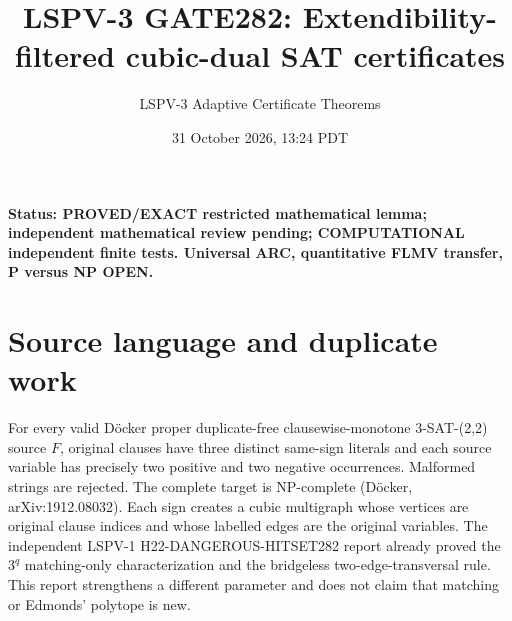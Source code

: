 \documentclass[11pt]{article}
\title{LSPV-3 GATE282: Extendibility-filtered cubic-dual SAT certificates}
\author{LSPV-3 Adaptive Certificate Theorems}
\date{31 October 2026, 13:24 PDT}
\begin{document}
\maketitle
\noindent\textbf{Status: PROVED/EXACT restricted mathematical lemma; independent mathematical review pending; COMPUTATIONAL independent finite tests. Universal ARC, quantitative FLMV transfer, P versus NP OPEN.}
\section{Source language and duplicate work}
For every valid D\"ocker proper duplicate-free clausewise-monotone 3-SAT-(2,2) source $F$, original clauses have three distinct same-sign literals and each source variable has precisely two positive and two negative occurrences. Malformed strings are rejected. The complete target is NP-complete (D\"ocker, arXiv:1912.08032). Each sign creates a cubic multigraph whose vertices are original clause indices and whose labelled edges are the original variables. The independent LSPV-1 H22-DANGEROUS-HITSET282 report already proved the $3^q$ matching-only characterization and the bridgeless two-edge-transversal rule. This report strengthens a different parameter and does not claim that matching or Edmonds' polytope is new.
\end{document}
